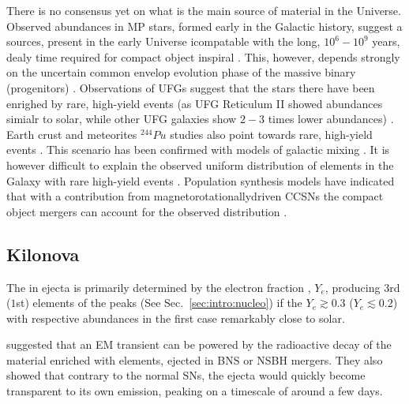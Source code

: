 There is no consensus yet on what is the main source of \rproc{} material in the 
Universe. 
Observed \rproc{} abundances in \ac{MP} stars, formed early in the Galactic history, 
suggest a sources, present in the early Universe icompatable with the long, 
$10^{6} - 10^{9}$ years, dealy time required for compact object inspiral 
\citep{DeDonder:2004cx,Dominik:2012kk}. This, however, depends strongly on the 
uncertain common envelop evolution phase of the massive binary (progenitors)
\citep[\eg]{Dominik:2012kk}.
%
Observations of \acp{UFG} suggest that the stars there have been enrighed by rare, 
high-yield events (as \ac{UFG} Reticulum II showed abundances simialr to solar, 
while other \ac{UFG} galaxies show $2-3$ times lower abundances) \citep{Ji:2016}.
%
Earth crust and meteorites $^{244}Pu$ studies also point towards rare, high-yield 
events \citep{Wallner:2015,Tsujimoto:2017}. This scenario has been confirmed with 
models of galactic mixing \citep{Hotokezaka:2015zea}.
%
It is however difficult to explain the observed uniform distribution of \rproc{} 
elements in the Galaxy with rare high-yield events \citep{Argast:2003he}.
%
Population synthesis models have indicated that with a contribution from 
magnetorotationallydriven \acp{CCSN} the compact object mergers can account for the 
observed distribution \citep{Ishimaru:2015,Cescutti:2015,Wehmeyer:2015,VanDeVoort:2015}.


\subsection{Kilonova}

The \rproc{} \nuc{} in ejecta is primarily determined by the electron fraction 
\citep{Lippuner:2015gwa}, $Y_e$, producing $3$rd ($1$st) elements of the \rproc{} peaks 
(See Sec.~\ref{sec:intro:nucleo}) if the $Y_e{\gtrsim}0.3$ ($Y_e{\lesssim}0.2$) 
with respective abundances in the first case remarkably close to solar. 

\citet{Li:1998bw} suggested that an \ac{EM} transient can be powered by 
the radioactive decay of the material enriched with \rproc{} elements, ejected in 
\ac{BNS} or \ac{NSBH} mergers. They also showed that contrary to the normal \acp{SN}, 
the ejecta would quickly become transparent to its own emission, peaking on a timescale 
of around a few days. 

